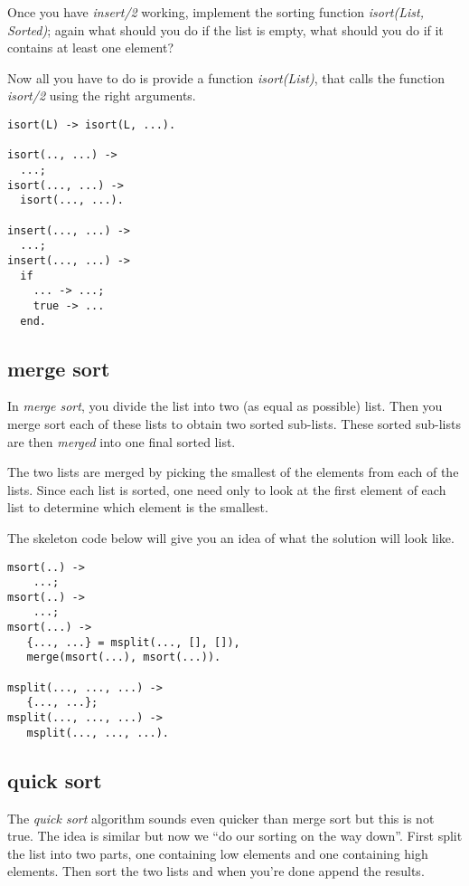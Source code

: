 \documentclass[a4paper,11pt]{article}
\begin{document}
Once you have {\em insert/2} working, implement the sorting function
{\em isort(List, Sorted)}; again what should you do if the list is
empty, what should you do if it contains at least one element?

Now all you have to do is provide a function {\em isort(List)}, that
calls the function {\em isort/2} using the right arguments.

\begin{verbatim}
isort(L) -> isort(L, ...).

isort(.., ...) ->
  ...;
isort(..., ...) ->
  isort(..., ...).

insert(..., ...) ->
  ...;
insert(..., ...) ->
  if 
    ... -> ...;
    true -> ...
  end.
\end{verbatim}


\subsection{merge sort}

In {\em merge sort}, you divide the list into two (as equal as
possible) list. Then you merge sort each of these lists to obtain two
sorted sub-lists. These sorted sub-lists are then {\em merged} into
one final sorted list. 

The two lists are merged by picking the smallest of the elements from
each of the lists. Since each list is sorted, one need only to look at
the first element of each list to determine which element is the
smallest.

The skeleton code below will give you an idea of what the solution
will look like.

\begin{verbatim}
msort(..) -> 
    ...;
msort(..) -> 
    ...;
msort(...) ->
   {..., ...} = msplit(..., [], []),
   merge(msort(...), msort(...)).

msplit(..., ..., ...) ->
   {..., ...};
msplit(..., ..., ...) ->
   msplit(..., ..., ...).
\end{verbatim}

\subsection{quick sort}

The {\em quick sort} algorithm sounds even quicker than merge sort but
this is not true. The idea is similar but now we ``do our sorting on
the way down''. First split the list into two parts, one containing low
elements and one containing high elements. Then sort the two lists and
when you're done append the results. 
\end{document}
